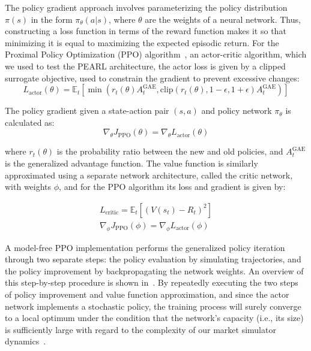 \documentclass[11pt]{article}
\begin{document}
    The policy gradient approach involves parameterizing the policy distribution 
    $\pi(s)$ in the form $\pi_\theta(a|s)$, where $\theta$ are the weights of a neural network.
    Thus, constructing a loss function in terms of the reward function makes it so that minimizing 
    it is equal to maximizing the expected episodic return.
    For the Proximal Policy Optimization (PPO) algorithm~\citep{Schulman2017}, an actor-critic algorithm, which we used to test the PEARL architecture,
    the actor loss is given by a clipped surrogate objective, used to constrain the gradient to prevent excessive changes:
    \begin{equation}
        L_{\text{actor}}(\theta) = \mathbb{E}_t \left[ 
            \min \left( r_t(\theta) A^{\text{GAE}}_t, \text{clip}(r_t(\theta), 1-\epsilon, 1+\epsilon) A^{\text{GAE}}_t \right) 
        \right]
        \label{eq:actor_loss}
    \end{equation}

    The policy gradient given a state-action pair \( (s, a) \) and policy network \( \pi_\theta \) is calculated as:
    \begin{equation}
        \nabla_\theta J_\text{PPO}(\theta) = \nabla_\theta L_{\text{actor}}(\theta)
        \label{eq:actor_gradient}
    \end{equation}
    
    where \( r_t(\theta) \) is the probability ratio between the new and old policies, and \( A^{\text{GAE}}_t \) is the generalized advantage function.
    The value function is similarly approximated using a separate network architecture, called the critic network, with weights $\phi$, 
    and for the PPO algorithm its loss and gradient is given by:

    \begin{equation}        
        \begin{aligned}
            L_{\text{critic}} = \mathbb{E}_t \left[ (V(s_t) - R_t)^2 \right]\\ 
            \nabla_\phi J_\text{PPO}(\phi) = \nabla_\phi L_{\text{actor}}(\phi)
        \end{aligned}
        \label{eq:critic_loss}
    \end{equation}

    A model-free PPO implementation performs the generalized policy iteration through two separate steps: 
    the policy evaluation by simulating trajectories, and the policy improvement by backpropagating the network weights.
    An overview of this step-by-step procedure is shown in~.
    By repeatedly executing the two steps of policy improvement and value function approximation, 
    and since the actor network implements a stochastic policy, 
    the training process will surely converge to a local optimum under the condition that the network's capacity 
    (i.e., its size) is sufficiently large with regard to the complexity of our market simulator dynamics~\citep{Sutton2000, Schulman2015}.
\end{document}
